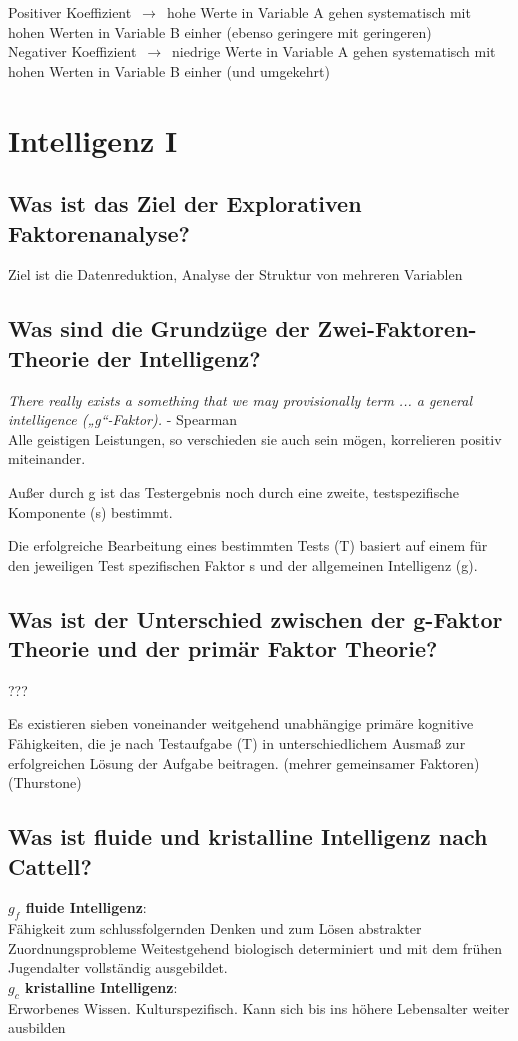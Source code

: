 \documentclass[a6paper,9pt,DIV=14]{scrartcl}
\begin{document}
    Positiver Koeffizient  $\,\to\,$ hohe Werte in Variable A gehen systematisch mit hohen Werten in Variable B einher (ebenso geringere mit geringeren)\\
    Negativer Koeffizient  $\,\to\,$ niedrige Werte in Variable A gehen systematisch mit hohen Werten in Variable B einher (und umgekehrt)

\section{Intelligenz I}

\subsection{Was ist das Ziel der Explorativen Faktorenanalyse?} %
Ziel ist die Datenreduktion, Analyse der Struktur von mehreren Variablen
\subsection{Was sind die Grundzüge der Zwei-Faktoren-Theorie der Intelligenz?} %
\textit{There really exists a something that we may provisionally term ... a general intelligence („g“-Faktor).} - Spearman\\

Alle geistigen Leistungen, so verschieden sie auch sein mögen, korrelieren positiv miteinander.

Außer durch g ist das Testergebnis noch durch eine zweite, testspezifische Komponente (s) bestimmt.

Die erfolgreiche Bearbeitung eines bestimmten Tests (T) basiert auf einem für den jeweiligen Test spezifischen Faktor s und der allgemeinen Intelligenz (g).
\subsection{Was ist der Unterschied zwischen der g-Faktor Theorie und der primär Faktor Theorie?} %
???

Es existieren sieben voneinander weitgehend unabhängige primäre kognitive Fähigkeiten, die je nach Testaufgabe (T) in unterschiedlichem Ausmaß zur erfolgreichen Lösung der Aufgabe beitragen.
    (mehrer gemeinsamer Faktoren) (Thurstone)
\subsection{Was ist fluide und kristalline Intelligenz nach Cattell?} %
    \textbf{$g_f$ fluide Intelligenz}:\\
    Fähigkeit zum schlussfolgernden Denken und zum Lösen abstrakter Zuordnungsprobleme
    Weitestgehend biologisch determiniert und mit dem frühen Jugendalter vollständig ausgebildet.\\
    \textbf{$g_c$ kristalline Intelligenz}:\\
    Erworbenes Wissen. Kulturspezifisch. Kann sich bis ins höhere Lebensalter weiter ausbilden
\end{document}
